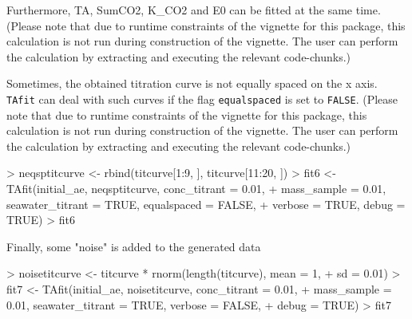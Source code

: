 \documentclass[article,nojss]{jss}
\begin{document}
Furthermore, TA, SumCO2, K\_CO2 and E0 can be fitted at the same time.
(Please note that due to runtime constraints of the vignette for this package, this calculation is not run during construction of the vignette. 
 The user can perform the calculation by extracting and executing the relevant code-chunks.)
\begin{Schunk}
\end{Schunk}

Sometimes, the obtained titration curve is not equally spaced on the x axis. \texttt{TAfit} can deal with such curves if the flag
\texttt{equalspaced} is set to \texttt{FALSE}. (Please note that due to runtime constraints of the vignette for this package, this calculation is not run during construction of the vignette. 
 The user can perform the calculation by extracting and executing the relevant code-chunks.)
\begin{Schunk}
\begin{Sinput}
> neqsptitcurve <- rbind(titcurve[1:9, ], titcurve[11:20, ])
> fit6 <- TAfit(initial_ae, neqsptitcurve, conc_titrant = 0.01, 
+     mass_sample = 0.01, seawater_titrant = TRUE, equalspaced = FALSE, 
+     verbose = TRUE, debug = TRUE)
> fit6
\end{Sinput}
\end{Schunk}

Finally, some "noise" is added to the generated data
\begin{Schunk}
\begin{Sinput}
> noisetitcurve <- titcurve * rnorm(length(titcurve), mean = 1, 
+     sd = 0.01)
> fit7 <- TAfit(initial_ae, noisetitcurve, conc_titrant = 0.01, 
+     mass_sample = 0.01, seawater_titrant = TRUE, verbose = FALSE, 
+     debug = TRUE)
> fit7
\end{Sinput}
\end{Schunk}
\end{document}

